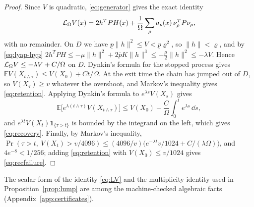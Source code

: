 \begin{proof}
Since \(V\) is quadratic, \eqref{eq:generator} gives the exact identity
\begin{equation}\label{eq:LV}
 \mathcal L_\Omega V(x)=2h^TPH(x)+\frac1\Omega\sum_\rho a_\rho(x)\,\nu_\rho^TP\nu_\rho ,
\end{equation}
with no remainder. On \(D\) we have \(\underline p\|h\|^2\le V<\underline p\varrho^2\), so
\(\|h\|<\varrho\), and by \eqref{eq:lyap-hyp}
\(2h^TPH\le-\mu\|h\|^2+2\overline pK\|h\|^3\le-\tfrac\mu2\|h\|^2\le-\lambda V\). Hence
\(\mathcal L_\Omega V\le-\lambda V+C/\Omega\) on \(D\). Dynkin's formula for the stopped process gives
\(\mathbb EV(X_{t\wedge\tau})\le V(X_0)+Ct/\Omega\). At the exit time the chain has jumped out
of \(D\), so \(V(X_\tau)\ge v\) whatever the overshoot, and Markov's inequality gives
\eqref{eq:retention}. Applying Dynkin's formula to \(e^{\lambda s}V(X_s)\) gives
\[
 \mathbb E\bigl[e^{\lambda(t\wedge\tau)}V(X_{t\wedge\tau})\bigr]
 \le V(X_0)+\frac C\Omega\int_0^te^{\lambda s}\,\dd s ,
\]
and \(e^{\lambda t}V(X_t)\mathbf 1_{\{\tau>t\}}\) is bounded by the integrand on the left, which
gives \eqref{eq:recovery}. Finally, by Markov's inequality,
\(\Pr(\tau>t,\ V(X_t)>v/4096)\le(4096/v)\bigl(e^{-\lambda t}v/1024+C/(\lambda\Omega)\bigr)\), and
\(4e^{-8}<1/256\); adding \eqref{eq:retention} with \(V(X_0)\le v/1024\) gives
\eqref{eq:recfailure}.
\end{proof}
The scalar form of the identity \eqref{eq:LV} and the multiplicity identity used in
Proposition~\ref{prop:lump} are among the machine-checked algebraic facts
(Appendix~\ref{app:certificates}).

